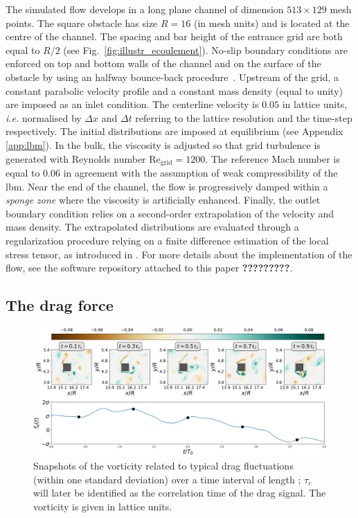 \documentclass{jfm}
\newcommand{\EL}[1]{{\color{myred}{#1}}}
\begin{document}
%
The simulated flow develops in a long plane channel of dimension $513 \times 129$ mesh points. The square obstacle has size $R=16$ (in mesh units) and is located at the centre of the channel. The spacing and bar height of the entrance grid are both equal to $R/2$ (see Fig.~\ref{fig:illustr_ecoulement}). 
%
No-slip boundary conditions are enforced on top and bottom walls of the channel and on the surface of the obstacle by using an halfway bounce-back procedure~\citep{lbm_book}.  
%
Upstream of the grid, a constant parabolic velocity profile and a constant mass density (equal to unity) are imposed as an inlet condition. 
The centerline velocity is $0.05$ in lattice units, \textit{i.e.} normalised by $\Delta x$ and $\Delta t$ referring to the lattice resolution and the time-step respectively. The initial distributions are imposed at equilibrium (see Appendix \ref{app:lbm}). 
In the bulk, the viscosity is adjusted so that grid turbulence is generated with Reynolds number $\mathrm{Re_{grid}}=1200$. The reference Mach number is equal to $0.06$ in agreement with the assumption of weak compressibility of the \ac{lbm}. 
Near the end of the channel, the flow is progressively damped within a \textit{sponge zone} where the viscosity is artificially enhanced.
Finally, the outlet boundary condition relies on a second-order extrapolation of the velocity and mass density.
The extrapolated distributions are evaluated through a regularization procedure relying on a finite difference estimation of the local stress tensor, as introduced in \citep{latt2008straight}. For more details about the implementation of the flow, see the software repository attached to this paper \textbf{?????????}.


\subsection{The drag force}
\label{sec:drag_force}

\begin{figure}
	\centering
	\includegraphics[width=\linewidth]{ecoulement_typique/ecoulement_typique.png}
	\caption{Snapshots of the vorticity related to typical drag fluctuations (within one standard deviation) over a time interval of length \EL{$\tau_c \simeq 4T_0$}; $\tau_c$ will later be identified as the correlation time of the drag signal.
		The vorticity is given in lattice units.}
	\label{fig:typical_vorticity}
\end{figure}
\end{document}
